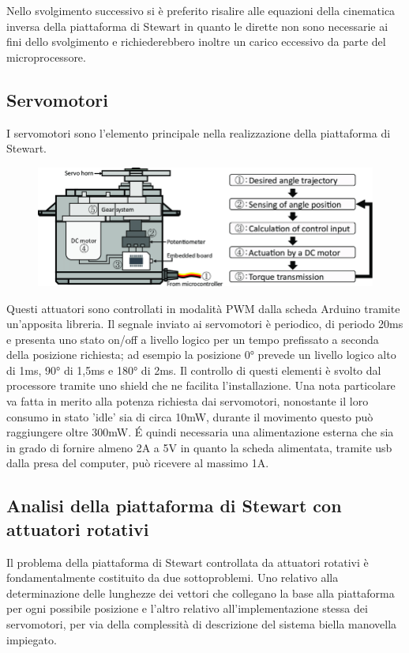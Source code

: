 \documentclass[11pt]{article}
\begin{document}
Nello svolgimento successivo si è preferito risalire alle equazioni della cinematica inversa della piattaforma di Stewart in quanto le dirette non sono necessarie ai fini dello svolgimento e richiederebbero inoltre un carico eccessivo da parte del microprocessore.


\subsection{Servomotori}\label{servomotori}
I servomotori sono l'elemento principale nella realizzazione della piattaforma di Stewart.

\begin{figure}[h!]
\centering
\includegraphics[scale=0.3]{Schematic-of-an-RC-servo-motor.png}
\end{figure}


Questi attuatori sono controllati in modalità PWM dalla scheda Arduino tramite un'apposita libreria. Il segnale inviato ai servomotori è periodico, di periodo 20ms e presenta uno stato on/off a livello logico per un tempo prefissato a seconda della posizione richiesta; ad esempio la posizione 0° prevede un livello logico alto di 1ms, 90° di 1,5ms e 180° di 2ms. Il controllo di questi elementi è svolto dal processore tramite uno shield che ne facilita l'installazione. Una nota particolare va fatta in merito alla potenza richiesta dai servomotori, nonostante il loro consumo in stato 'idle' sia di circa 10mW, durante il movimento questo può raggiungere oltre 300mW. É quindi necessaria una alimentazione esterna che sia in grado di fornire almeno 2A a 5V in quanto la scheda alimentata, tramite usb dalla presa del computer, può ricevere al massimo 1A.

\newpage
\subsection{Analisi della piattaforma di Stewart con attuatori rotativi}\label{analisi}

Il problema della piattaforma di Stewart controllata da attuatori rotativi è fondamentalmente costituito da due sottoproblemi.
Uno relativo alla determinazione delle lunghezze dei vettori che collegano la base alla piattaforma per ogni possibile posizione e l'altro relativo all'implementazione stessa dei servomotori, per via della complessità di descrizione del sistema biella manovella impiegato. 
\end{document}
